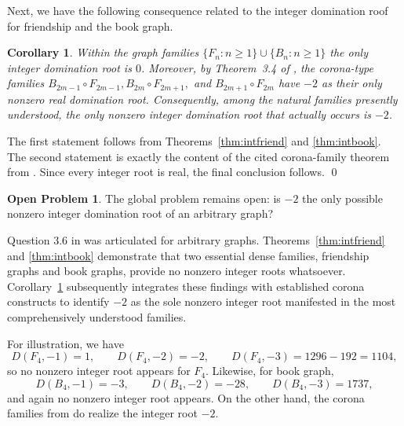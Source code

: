 \documentclass[12pt]{article}
\newtheorem{corollary}[theorem]{Corollary}
\theoremstyle{definition}
\newtheorem{openproblem}[theorem]{Open Problem}
\renewenvironment{proof}{{\noindent\bfseries Proof.}}{\qed}
\begin{document}
	Next, we have the following consequence related to the integer domination roof for friendship and the book graph.
	\begin{corollary}
		\label{cor:partialinteger}
		Within the graph families $ \{F_n:n\ge 1\}\cup \{B_n:n\ge 1\} $ the only integer domination root is $0$. Moreover, by Theorem~3.4 of \cite{AlikhaniBrownJahari2016}, the corona-type families $ B_{2m-1}\circ F_{2m-1}, B_{2m}\circ F_{2m+1},$ and $ B_{2m+1}\circ F_{2m}$ have $-2$ as their only nonzero real domination root. Consequently, among the natural families presently understood, the only nonzero integer domination root that actually occurs is $-2$.
	\end{corollary}
	
	\begin{proof}
		The first statement follows from Theorems~\ref{thm:intfriend} and \ref{thm:intbook}. The second statement is exactly the content of the cited corona-family theorem from \cite{AlikhaniBrownJahari2016}. Since every integer root is real, the final conclusion follows.
	\end{proof}
	
	\begin{openproblem}
		The global problem remains open: is $-2$ the only possible nonzero integer domination root of an arbitrary graph?
	\end{openproblem}
	
	 Question 3.6 in \cite{AlikhaniBrownJahari2016} was articulated for arbitrary graphs. Theorems~\ref{thm:intfriend} and \ref{thm:intbook} demonstrate that two essential dense families, friendship graphs and book graphs, provide no nonzero integer roots whatsoever. Corollary~\ref{cor:partialinteger} subsequently integrates these findings with established corona constructs to identify $-2$ as the sole nonzero integer root manifested in the most comprehensively understood families.
	
	 For illustration, we have
		$$
		D(F_4,-1) = 1,\qquad D(F_4,-2)=-2,\qquad D(F_4,-3)=1296-192=1104,
		$$
		so no nonzero integer root appears for $F_4$. Likewise, for book graph,
		$$
		D(B_4,-1)=-3,\qquad D(B_4,-2)=-28,\qquad D(B_4,-3)=1737,
		$$
		and again no nonzero integer root appears. On the other hand, the corona families from \cite{AlikhaniBrownJahari2016} do realize the integer root $-2$. 
	
\end{document}
